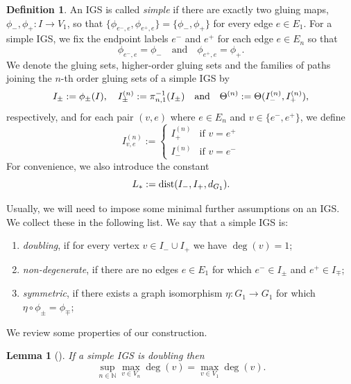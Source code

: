 \documentclass{amsart}
\newcommand{\dist}{{\rm dist}}
\newtheorem{lemma}[equation]{Lemma}
\numberwithin{equation}{section}
\theoremstyle{definition}
\newtheorem{definition}[equation]{Definition}
\theoremstyle{remark}
\newcommand{\N}{\mathbb{N}}
\begin{document}
\begin{definition}\label{Definition: Simple IGS}
An IGS is called \emph{simple} if there are exactly two gluing maps, \(\phi_-,\phi_+\colon I\to V_1\), so that \(\{\phi_{e^-,e},\phi_{e^+,e}\}=\{\phi_-,\phi_+\}\) for every edge \(e\in E_1\). For a simple IGS, we fix the endpoint labels \(e^-\) and \(e^+\) for each edge \(e\in E_n\) so that
    \[
        \phi_{e^-,e}=\phi_-\quad\text{and}\quad \phi_{e^+,e}=\phi_+.
    \]
We denote the gluing sets, higher-order gluing sets and the families of paths joining the \(n\)-th order gluing sets of a simple IGS by 
    \[
        I_\pm:=\phi_\pm(I),\quad I_\pm^{\smash{(n)}}:=\pi_{n,1}^{-1}(I_\pm)\quad\text{and}\quad\Theta^{\smash{(n)}}:=\Theta(I_-^{\smash{(n)}},I_+^{\smash{(n)}}),
    \]
respectively, and for each pair \((v,e)\) where \(e\in E_n\) and \(v\in \{e^-,e^+\}\), we define
    \[
        I_{v,e}^{(n)}:=\begin{cases}
            I_+^{(n)}&\text{if }v=e^+\\
            I_-^{(n)}&\text{if }v=e^-
        \end{cases}
    \]
For convenience, we also introduce the constant 
\[L_*:=\dist(I_-,I_+,d_{G_1}).\]

Usually, we will need to impose some minimal further assumptions on an IGS. We collect these in the following list. We say that a simple IGS is:
    \begin{enumerate}
        \item \emph{doubling}, if for every vertex \(v\in I_-\cup I_+\) we have \(\deg(v)=1\); 
        
        \item \emph{non-degenerate}, if there are no edges \(e\in E_1\) for which \(e^-\in I_\pm\) and \(e^+\in I_\mp\); 
        
        \item \emph{symmetric}, if there exists a graph isomorphism \(\eta:G_1\to G_1\)   for which \(\eta\circ\phi_\pm = \phi_\mp\);
    \end{enumerate}
\end{definition}




We review some properties of our construction.

\begin{lemma}[{\cite[Lemma 3.21]{anttila2024constructions}}]\label{Lemma: Doubling degree bound}
If a simple IGS is doubling then
    \[
    \sup_{n \in \N} \max_{v\in V_n}\deg(v)=\max_{v\in V_1}\deg(v).
    \]
\end{lemma}
\end{document}
